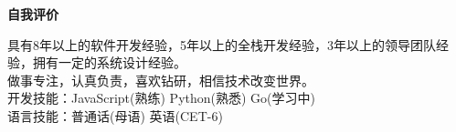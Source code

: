\documentclass[a4paper]{article}
\newenvironment{changemargin}[2]{%
  \begin{list}{}{%
    \setlength{\topsep}{0pt}%
    \setlength{\leftmargin}{#1}%
    \setlength{\rightmargin}{#2}%
    \setlength{\listparindent}{\parindent}%
    \setlength{\itemindent}{\parindent}%
    \setlength{\parsep}{\parskip}%
  }%
  \item[]}{\end{list}
}
\newcommand{\lineover}{
	\begin{changemargin}{-0.05in}{-0.05in}
		\vspace*{-8pt}
		\hrulefill \\
		\vspace*{-2pt}
	\end{changemargin}
}
\newcommand{\header}[1]{
	\begin{changemargin}{-0.5in}{-0.5in}
	\fontsize{12}{14} \scshape{\textbf{#1}}\\
	\end{changemargin}
}
\newenvironment{body} {
	\vspace*{-16pt}
	\begin{changemargin}{-0.5in}{-0.5in}
  }	
	{\end{changemargin}
}
\begin{document}
	



\header{自我评价}

\begin{body}
	\vspace{14pt}
	具有8年以上的软件开发经验，5年以上的全栈开发经验，3年以上的领导团队经验，拥有一定的系统设计经验。\\
	做事专注，认真负责，喜欢钻研，相信技术改变世界。\\
	开发技能：{\fontarial JavaScript}(熟练) {\fontarial Python}(熟悉) Go(学习中)\\
	语言技能：普通话(母语) 英语({\fontarial CET-6})\\
\end{body}
\end{document}
